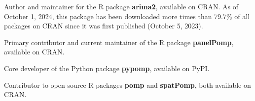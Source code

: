 \documentclass[11pt]{article}
\begin{document}
\noindent Author and maintainer for the R package \textbf{arima2}, available on CRAN. As of October 1, 2024, this package has been downloaded more times than $79.7\%$ of all packages on CRAN since it was first published (October 5, 2023).

\vspace{2mm}
\noindent Primary contributor and current maintainer of the R package \textbf{panelPomp}, available on CRAN.

\vspace{2mm}
\noindent Core developer of the Python package \textbf{pypomp}, available on PyPI.

\vspace{2mm}
\noindent Contributor to open source R packages \textbf{pomp} and \textbf{spatPomp}, both available on CRAN.
\end{document}
